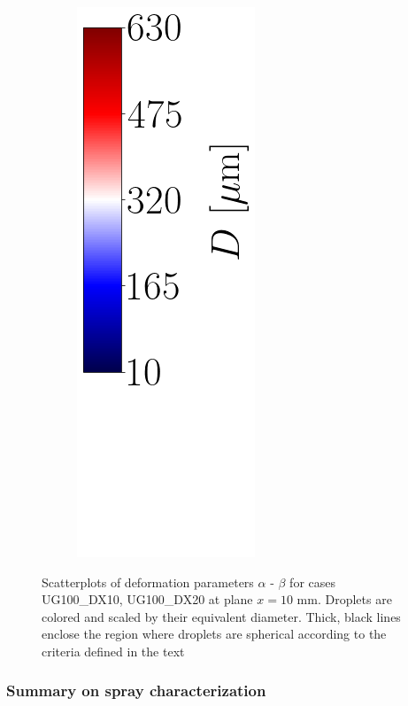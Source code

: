 \begin{figure}[ht]
\begin{subfigure}[b]{0.4\textwidth}
\end{subfigure}
\begin{subfigure}[b]{0.1\textwidth}
	\centering
	\hspace*{0.35in}
   \includegraphics[scale=0.4]{./part2_developments/figures_ch5_resolved_JICF/SPRAY_characterization/deformation/scatterplots_colorbar_D_with_blank_space.png}
\end{subfigure}
   \caption[Scatterplots of deformation parameters $\alpha$ - $\beta$ for cases UG100\_DX10, UG100\_DX20 at plane $x = 10$ mm]{Scatterplots of deformation parameters $\alpha$ - $\beta$ for cases UG100\_DX10, UG100\_DX20 at plane $x = 10$ mm. Droplets are colored and scaled by their equivalent diameter. Thick, black lines enclose the region where droplets are spherical according to the criteria defined in the text}
\label{fig:jicf_global_scatterplots_deformation}
\end{figure}



\subsubsection{Summary on spray characterization}

